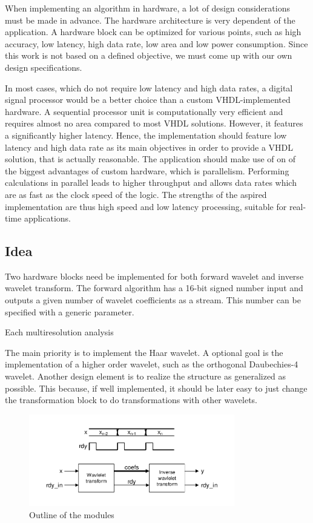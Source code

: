 \begin{refsection}
When implementing an algorithm in hardware, a lot of design considerations must be made in advance.
The hardware architecture is very dependent of the application.
A hardware block can be optimized for various points, such as high accuracy, low latency, high data rate, low area and low power consumption.
Since this work is not based on a defined objective, we must come up with our own design specifications.

In most cases, which do not require low latency and high data rates, a digital signal processor would be a better choice than a custom VHDL-implemented hardware.
A sequential processor unit is computationally very efficient and requires almost no area compared to most VHDL solutions.
However, it features a significantly higher latency.
Hence, the implementation should feature low latency and high data rate as its main objectives in order to provide a VHDL solution, that is actually reasonable.
The application should make use of on of the biggest advantages of custom hardware, which is parallelism.
Performing calculations in parallel leads to higher throughput and allows data rates which are as fast as the clock speed of the logic.
The strengths of the aspired implementation are thus high speed and low latency processing, suitable for real-time applications.


\subsection{Idea}

Two hardware blocks need be implemented for both forward wavelet and inverse wavelet transform.
The forward algorithm has a 16-bit signed number input and outputs a given number of wavelet coefficients as a stream.
This number can be specified with a generic parameter.

Each multiresolution analysis 

The main priority is to implement the Haar wavelet.
A optional goal is the implementation of a higher order wavelet, such as the orthogonal Daubechies-4 wavelet.
Another design element is to realize the structure as generalized as possible.
This because, if well implemented, it should be later easy to just change the transformation block to do transformations with other wavelets.


\begin{figure}
	\centering
	\includegraphics[width=0.8\textwidth]{./images/idea.pdf}
	\caption{Outline of the modules \label{fpga:idea}}
\end{figure}



\end{refsection}

